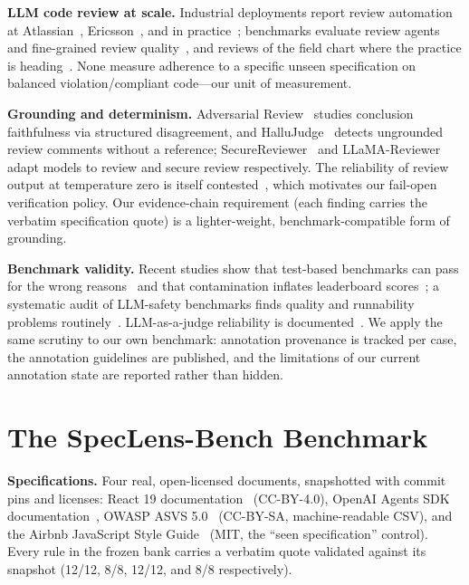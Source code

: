\documentclass[11pt]{article}
\begin{document}
\textbf{LLM code review at scale.} Industrial deployments report review
automation at Atlassian~\cite{rovodev2026}, Ericsson~\cite{ericsson2025}, and
in practice~\cite{reviewinpractice2025}; benchmarks evaluate review
agents~\cite{crabenchmark2026,crbench2026} and fine-grained review
quality~\cite{enrichedcontext2025}, and reviews of the field chart where the
practice is heading~\cite{quovadis2026}. None measure adherence to a specific
unseen specification on balanced violation/compliant code---our unit of
measurement.

\textbf{Grounding and determinism.} Adversarial Review~\cite{groundedreview2026}
studies conclusion faithfulness via structured disagreement, and
HalluJudge~\cite{hallujudge2026} detects ungrounded review comments without a
reference; SecureReviewer~\cite{securereviewer2025} and
LLaMA-Reviewer~\cite{llamareviewer2023} adapt models to review and secure
review respectively. The reliability of review output at temperature zero is
itself contested~\cite{determinism2025}, which motivates our fail-open
verification policy. Our evidence-chain requirement (each finding carries the
verbatim specification quote) is a lighter-weight, benchmark-compatible form of
grounding.

\textbf{Benchmark validity.} Recent studies show that test-based benchmarks
can pass for the wrong reasons~\cite{swesolved2025} and that contamination
inflates leaderboard scores~\cite{sweillusion2025}; a systematic audit of
LLM-safety benchmarks finds quality and runnability problems
routinely~\cite{benchofbench2026}. LLM-as-a-judge reliability is
documented~\cite{llmjudgesurvey2024,sejury2025,codejudgebench2025}. We apply
the same scrutiny to our own benchmark: annotation provenance is tracked per
case, the annotation guidelines are published, and the limitations of our
current annotation state are reported rather than hidden.

\section{The SpecLens-Bench Benchmark}
\label{sec:benchmark}
\textbf{Specifications.} Four real, open-licensed documents, snapshotted with
commit pins and licenses: React 19 documentation~\cite{reactdocs} (CC-BY-4.0),
OpenAI Agents SDK documentation~\cite{openaisdk}, OWASP ASVS 5.0~\cite{asvs}
(CC-BY-SA, machine-readable CSV), and the Airbnb JavaScript Style
Guide~\cite{airbnbjs} (MIT, the ``seen specification'' control). Every rule in
the frozen bank carries a verbatim quote validated against its snapshot
(12/12, 8/8, 12/12, and 8/8 respectively).
\end{document}
